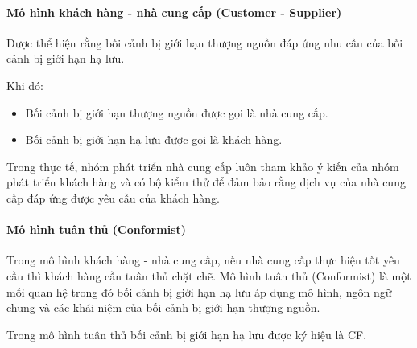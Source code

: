 \paragraph{Mô hình khách hàng - nhà cung cấp (Customer - Supplier)}


Được thể hiện rằng bối cảnh bị giới hạn thượng nguồn đáp ứng nhu cầu của bối cảnh bị giới hạn hạ lưu.

Khi đó:

\begin{itemize}

\item Bối cảnh bị giới hạn thượng nguồn được gọi là nhà cung cấp.

\item Bối cảnh bị giới hạn hạ lưu được gọi là khách hàng.

\end{itemize}

Trong thực tế, nhóm phát triển nhà cung cấp luôn tham khảo ý kiến của nhóm phát triển khách hàng và có bộ kiểm thử để đảm bảo rằng dịch vụ của nhà cung cấp đáp ứng được yêu cầu của khách hàng.









\paragraph{Mô hình tuân thủ (Conformist)}   Trong mô hình khách hàng - nhà cung cấp, nếu nhà cung cấp thực hiện tốt yêu cầu thì khách hàng cần tuân thủ chặt chẽ. Mô hình tuân thủ (Conformist) là một mối quan hệ trong đó bối cảnh bị giới hạn hạ lưu áp dụng mô hình, ngôn ngữ chung và các khái niệm của bối cảnh bị giới hạn thượng nguồn.

Trong mô hình tuân thủ bối cảnh bị giới hạn hạ lưu được ký hiệu là CF.








